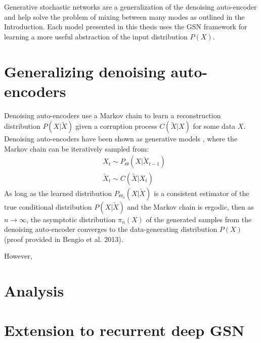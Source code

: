 Generative stochastic networks are a generalization of the denoising auto-encoder and help solve the problem of mixing between many modes as outlined in the Introduction. Each model presented in this thesis uses the GSN framework for learning a more useful abstraction of the input distribution \(P(X)\).

\section{Generalizing denoising auto-encoders}

Denoising auto-encoders use a Markov chain to learn a reconstruction distribution \(P(X|\widetilde{X})\) given a corruption process \(C(\widetilde{X}|X)\) for some data \(X\). Denoising auto-encoders have been shown as generative models \cite{bengio13a}, where the Markov chain can be iteratively sampled from:
\begin{align*}
 &X_t \sim P_\Theta(X|\widetilde{X}_{t-1})\\
 &\widetilde{X}_t \sim C(\widetilde{X}|X_t)
\end{align*}
As long as the learned distribution \(P_{\Theta_n}(X|\widetilde{X})\) is a consistent estimator of the true conditional distribution \(P(X|\widetilde{X})\) and the Markov chain is ergodic, then as \(n \rightarrow \infty\), the asymptotic distribution \(\pi_n(X)\) of the generated samples from the denoising auto-encoder converges to the data-generating distribution \(P(X)\) (proof provided in Bengio et al. 2013).

However, 

\section{Analysis}

\section{Extension to recurrent deep GSN}